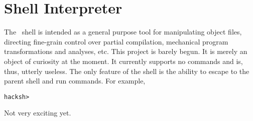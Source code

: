 
\chapter{Shell Interpreter}
\label{sec:shell}

The \hackt\ shell is intended as a general purpose tool for 
manipulating object files, directing fine-grain control over partial
compilation, mechanical program transformations and analyses, etc.
This project is barely begun.  
It is merely an object of curiosity at the moment.  
It currently supports no commands and is, thus, utterly useless.  
The only feature of the shell is the ability to escape to the 
parent shell and run commands.  
For example, 

\medskip
\noindent
\texttt{hacksh> \\
}
\medskip

Not very exciting yet.  


